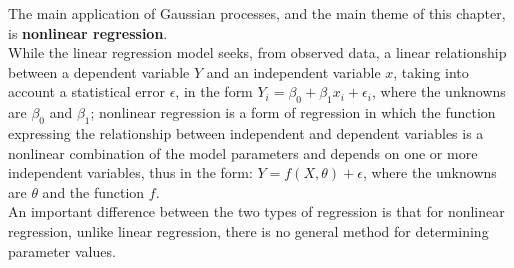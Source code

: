 \begin{oss}
  The main application of Gaussian processes, and the main theme of this chapter, is \textbf{nonlinear regression}.\\
  While the linear regression model seeks, from observed data, a linear relationship between a dependent variable $Y$ and an independent variable $x$, taking into account a statistical error $\epsilon$, in the form $Y_i=\beta_0+\beta_1 x_i+\epsilon_i$, where the unknowns are $\beta_0$ and $\beta_1$; nonlinear regression is a form of regression in which the function expressing the relationship between independent and dependent variables is a nonlinear combination of the model parameters and depends on one or more independent variables, thus in the form: $Y=f(X,\theta)+\epsilon$, where the unknowns are $\theta$ and the function $f$.\\
  An important difference between the two types of regression is that for nonlinear regression, unlike linear regression, there is no general method for determining parameter values. 


\end{oss}
